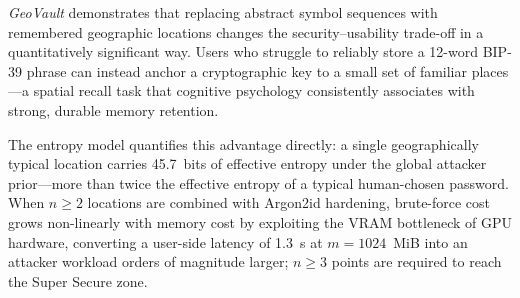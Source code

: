\documentclass[mathematics,article,accept,pdftex,moreauthors]{Definitions/mdpi}
\begin{document}
{\textit{GeoVault} demonstrates that replacing abstract symbol sequences with remembered geographic locations changes the security--usability trade-off in a quantitatively significant way. Users who struggle to reliably store a 12-word BIP-39 phrase can instead anchor a cryptographic key to a small set of familiar places---a spatial recall task that cognitive psychology consistently associates with strong, durable memory retention.}

{The entropy model quantifies this advantage directly: a single geographically typical location carries 45.7~bits of effective entropy under the global attacker prior---more than twice the effective entropy of a typical human-chosen password. When $n \geq 2$ locations are combined with Argon2id hardening, brute-force cost grows non-linearly with memory cost by exploiting the VRAM bottleneck of GPU hardware, converting a user-side latency of 1.3~s at $m=1024$~MiB into an attacker workload orders of magnitude larger; $n \geq 3$ points are required to reach the Super Secure zone.}
\end{document}
